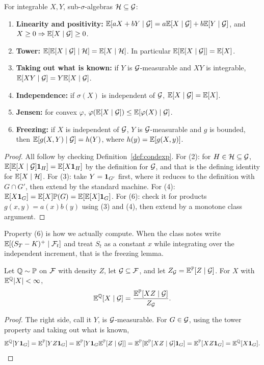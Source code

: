 \begin{proposition}\label{prop:ce}
For integrable $X,Y$, sub-$\sigma$-algebras $\mathcal{H}\subseteq\mathcal{G}$:
\begin{enumerate}
\item \textbf{Linearity and positivity:} $\mathbb{E}[aX+bY\mid\mathcal{G}]=a\mathbb{E}[X\mid\mathcal{G}]+b\mathbb{E}[Y\mid\mathcal{G}]$, and $X\ge0\Rightarrow\mathbb{E}[X\mid\mathcal{G}]\ge0$.
\item \textbf{Tower:} $\mathbb{E}[\mathbb{E}[X\mid\mathcal{G}]\mid\mathcal{H}]=\mathbb{E}[X\mid\mathcal{H}]$. In particular $\mathbb{E}[\mathbb{E}[X\mid\mathcal{G}]]=\mathbb{E}[X]$.
\item \textbf{Taking out what is known:} if $Y$ is $\mathcal{G}$-measurable and $XY$ is integrable, $\mathbb{E}[XY\mid\mathcal{G}]=Y\mathbb{E}[X\mid\mathcal{G}]$.
\item \textbf{Independence:} if $\sigma(X)$ is independent of $\mathcal{G}$, $\mathbb{E}[X\mid\mathcal{G}]=\mathbb{E}[X]$.
\item \textbf{Jensen:} for convex $\varphi$, $\varphi(\mathbb{E}[X\mid\mathcal{G}])\le\mathbb{E}[\varphi(X)\mid\mathcal{G}]$.
\item \textbf{Freezing:} if $X$ is independent of $\mathcal{G}$, $Y$ is $\mathcal{G}$-measurable and $g$ is bounded, then $\mathbb{E}[g(X,Y)\mid\mathcal{G}]=h(Y)$, where $h(y)=\mathbb{E}[g(X,y)]$.
\end{enumerate}
\end{proposition}
\begin{proof}
All follow by checking Definition~\ref{def:condexp}. For (2): for $H\in\mathcal{H}\subseteq\mathcal{G}$, $\mathbb{E}[\mathbb{E}[X\mid\mathcal{G}]\mathbf{1}_H]=\mathbb{E}[X\mathbf{1}_H]$ by the definition for $\mathcal{G}$, and that is the defining identity for $\mathbb{E}[X\mid\mathcal{H}]$. For (3): take $Y=\mathbf{1}_{G'}$ first, where it reduces to the definition with $G\cap G'$, then extend by the standard machine. For (4): $\mathbb{E}[X\mathbf{1}_G]=\mathbb{E}[X]\mathbb{P}(G)=\mathbb{E}[\mathbb{E}[X]\mathbf{1}_G]$. For (6): check it for products $g(x,y)=a(x)b(y)$ using (3) and (4), then extend by a monotone class argument.
\end{proof}

Property (6) is how we actually compute. When the class notes write $\mathbb{E}[(S_T-K)^+\mid\mathcal{F}_t]$ and treat $S_t$ as a constant $x$ while integrating over the independent increment, that is the freezing lemma.

\begin{theorem}\label{thm:bayes}
Let $\mathbb{Q}\sim\mathbb{P}$ on $\mathcal{F}$ with density $Z$, let $\mathcal{G}\subseteq\mathcal{F}$, and let $Z_{\mathcal{G}}=\mathbb{E}^{\mathbb{P}}[Z\mid\mathcal{G}]$. For $X$ with $\mathbb{E}^{\mathbb{Q}}|X|<\infty$,
\[
\mathbb{E}^{\mathbb{Q}}[X\mid\mathcal{G}]=\frac{\mathbb{E}^{\mathbb{P}}[XZ\mid\mathcal{G}]}{Z_{\mathcal{G}}}.
\]
\end{theorem}
\begin{proof}
The right side, call it $Y$, is $\mathcal{G}$-measurable. For $G\in\mathcal{G}$, using the tower property and taking out what is known,
\[
\mathbb{E}^{\mathbb{Q}}[Y\mathbf{1}_G]=\mathbb{E}^{\mathbb{P}}[YZ\mathbf{1}_G]=\mathbb{E}^{\mathbb{P}}[Y\mathbf{1}_G\mathbb{E}^{\mathbb{P}}[Z\mid\mathcal{G}]]=\mathbb{E}^{\mathbb{P}}[\mathbb{E}^{\mathbb{P}}[XZ\mid\mathcal{G}]\mathbf{1}_G]=\mathbb{E}^{\mathbb{P}}[XZ\mathbf{1}_G]=\mathbb{E}^{\mathbb{Q}}[X\mathbf{1}_G].\qedhere
\]
\end{proof}

